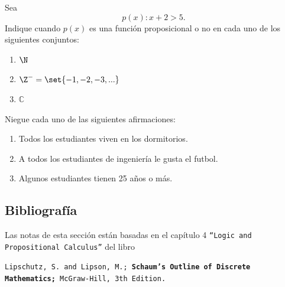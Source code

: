  \begin{problema}
  Sea $$p(x): x+2>5.$$ Indique cuando $p(x)$ es una función proposicional o no en cada uno de los siguientes conjuntos: 
  \begin{enumerate}
   \item $\N$ 
   \item $\Z^{-}=\set{-1,-2,-3,...}$ 
   \item $\mathbb{C}$
  \end{enumerate}

 \end{problema}




	\begin{problema}
	Niegue cada uno de las siguientes afirmaciones:
	\begin{enumerate}
		\item Todos los estudiantes viven en los dormitorios.
		\item A todos los estudiantes de ingeniería le gusta el futbol.
		\item Algunos estudiantes tienen 25 años o más.
	\end{enumerate}
	\end{problema}



\subsection{Bibliografía}
 Las notas de esta sección están basadas en el capítulo 4 \texttt{``Logic and Propositional Calculus''} del libro
 \begin{center}
  \texttt{Lipschutz, S. and Lipson, M.;\textbf{ Schaum's Outline of Discrete Mathematics;} McGraw-Hill, 3th Edition.}
 \end{center}
